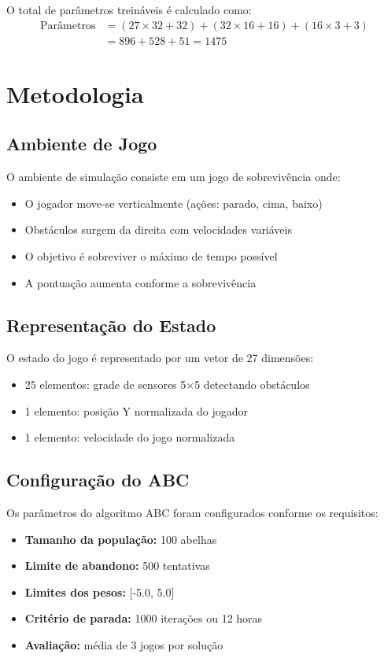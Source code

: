 \documentclass[review]{elsarticle}
\begin{document}
O total de parâmetros treináveis é calculado como:
\begin{align}
\text{Parâmetros} &= (27 \times 32 + 32) + (32 \times 16 + 16) + (16 \times 3 + 3) \\
&= 896 + 528 + 51 = 1475
\end{align}

\section{Metodologia}

\subsection{Ambiente de Jogo}

O ambiente de simulação consiste em um jogo de sobrevivência onde:
\begin{itemize}
\item O jogador move-se verticalmente (ações: parado, cima, baixo)
\item Obstáculos surgem da direita com velocidades variáveis
\item O objetivo é sobreviver o máximo de tempo possível
\item A pontuação aumenta conforme a sobrevivência
\end{itemize}

\subsection{Representação do Estado}

O estado do jogo é representado por um vetor de 27 dimensões:
\begin{itemize}
\item 25 elementos: grade de sensores 5×5 detectando obstáculos
\item 1 elemento: posição Y normalizada do jogador
\item 1 elemento: velocidade do jogo normalizada
\end{itemize}

\subsection{Configuração do ABC}

Os parâmetros do algoritmo ABC foram configurados conforme os requisitos:
\begin{itemize}
\item \textbf{Tamanho da população:} 100 abelhas
\item \textbf{Limite de abandono:} 500 tentativas
\item \textbf{Limites dos pesos:} [-5.0, 5.0]
\item \textbf{Critério de parada:} 1000 iterações ou 12 horas
\item \textbf{Avaliação:} média de 3 jogos por solução
\end{itemize}
\end{document}
